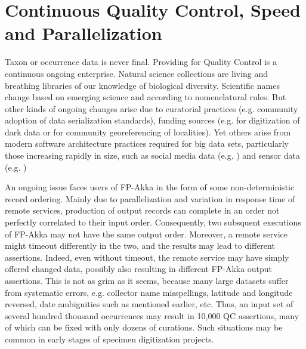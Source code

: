\documentclass{article}
\begin{document}



\section{Continuous Quality Control, Speed and Parallelization}
Taxon or occurrence data is never final. Providing for Quality Control is a continuous ongoing enterprise. Natural science collections are living and breathing libraries of our knowledge of biological diversity.  Scientific names change based on emerging science and according to nomenclatural rules.  But other kinds of ongoing changes arise due to curatorial practices (e.g. community adoption of data serialization standards), funding sources (e.g. for digitization of dark data or for community georeferencing of localities). Yet others arise from modern software architecture practices required for big data sets, particularly those increasing rapidly in size, such as social media data (e.g.\citep{Cai2015, Immonen2015} ) and sensor data (e.g. \citep{Campbell01072013})

An ongoing issue faces users of FP-Akka in the form of some non-deterministic record ordering.  Mainly due to parallelization and variation in response time of remote services, production of output records can complete in an order not perfectly correlated to their input order. Consequently,  two subsquent executions of FP-Akka may not have the same output order. Moreover, a remote service might timeout differently in the two, and the results may lead to different assertions.  Indeed, even without timeout, the remote service may have simply offered changed data, possibly also resulting in different FP-Akka output assertions.  This is not as grim as it seems, because many large datasets suffer from systematic errors, e.g. collector name misspellings, latitude and longitude reversed, date ambiguities such as mentioned earlier, etc.  Thus, an input set of several hundred thousand occurrences may result in 10,000 QC assertions, many of which can be fixed with only dozens of curations. Such situations may be common in early stages of specimen digitization projects.
\end{document}
